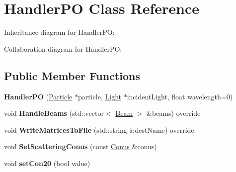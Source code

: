 \hypertarget{class_handler_p_o}{}\section{Handler\+PO Class Reference}
\label{class_handler_p_o}


Inheritance diagram for Handler\+PO\+:


Collaboration diagram for Handler\+PO\+:
\subsection*{Public Member Functions}
\begin{DoxyCompactItemize}
\item 
\mbox{\label{class_handler_p_o_ae4e146c9650b371deaeb6aa487e67928}} 
{\bfseries Handler\+PO} (\mbox{\hyperlink{class_particle}{Particle}} $\ast$particle, \mbox{\hyperlink{class_light}{Light}} $\ast$incident\+Light, float wavelength=0)
\item 
\mbox{\label{class_handler_p_o_a34614f0dab5f801ad4588fa5d1e0825d}} 
void {\bfseries Handle\+Beams} (std\+::vector$<$ \mbox{\hyperlink{class_beam}{Beam}} $>$ \&beams) override
\item 
\mbox{\label{class_handler_p_o_acd1699ce858357c838f4a2507013b4aa}} 
void {\bfseries Write\+Matrices\+To\+File} (std\+::string \&dest\+Name) override
\item 
\mbox{\label{class_handler_p_o_a0a25182f4636d39a85f00ff1c78dd833}} 
void {\bfseries Set\+Scattering\+Conus} (const \mbox{\hyperlink{struct_conus}{Conus}} \&conus)
\item 
\mbox{\label{class_handler_p_o_a5587518a68abb18ad556ec4f3521e397}} 
void {\bfseries set\+Con20} (bool value)
\end{DoxyCompactItemize}
